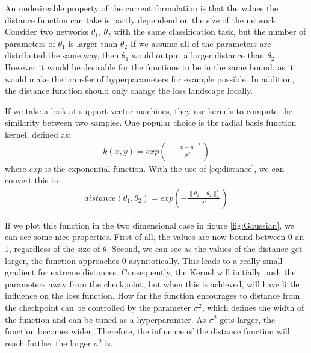 An undesireable property of the current formulation is that the values the
distance function can take is partly dependend on the size of the network.
Consider two networks $\theta_1$, $\theta_2$ with the same classification task,
but the number of parameters of $\theta_1$ is larger than $\theta_2$ If we
assume all of the parameters are distributed the same way, then $\theta_1$ would
output a larger distance than $\theta_2$. However it would be desirable for the
functions to be in the same bound, as it would make the transfer of
hyperparameters for example possible. In addition, the distance function should
only change the loss landscape locally.

If we take a look at support vector machines, they use kernels to compute the
similarity between two samples. One popular choice is the radial basis function
kernel, defined as:
\begin{align}\label{eq:RBF}
    k(x, y)=exp(-\frac{\rVert x -y \lVert^2}{\sigma^2})
\end{align}
where $exp$ is the exponential function. With the use of \ref{eq:distance}, we
can convert this to:
\begin{align}\label{eq:DistanceFinal}
    distance(\theta_1, \theta_2)=exp(-\frac{\rVert \theta_1 - \theta_2 \lVert_2^2}{\sigma^2})
\end{align}

If we plot this function in the two dimensional case in figure
\ref{fig:Gaussian}, we can see some nice properties. First of all, the values
are now bound between 0 an 1, regardless of the size of $\theta$. Second, we can
see as the values of the distance get larger, the function approaches 0
asymtotically. This leads to a really small gradient for extreme distances.
Consequently, the Kernel will initially push the parameters away from the
checkpoint, but when this is achieved, will have little influence on the loss
function. How far the function encourages to distance from the checkpoint can be
controlled by the parameter $\sigma^2$, which defines the width of the function
and can be tuned as a hyperparamter. As $\sigma^2$ gets larger, the function
becomes wider. Therefore, the influence of the distance function will reach
further the larger $\sigma^2$ is.


